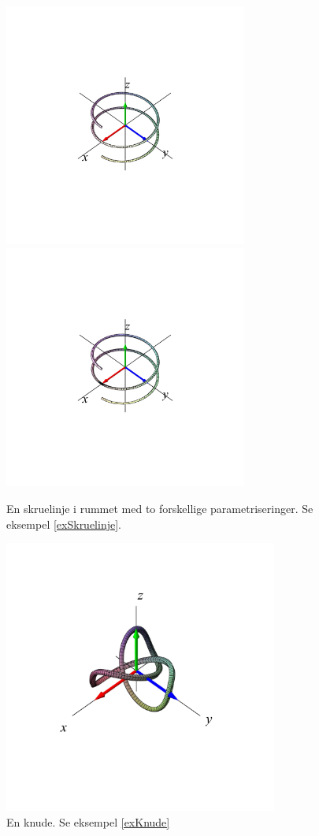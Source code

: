 \begin{figure}[ht]
\centerline{\includegraphics[height=80mm]{FIGS/plotHelix1}\, \, \, \includegraphics[height=80mm]{FIGS/plotHelix2}}
\begin{center}
\caption{\small{En skruelinje i rummet med to forskellige parametriseringer. Se
eksempel \ref{exSkruelinje}. }} \label{figv12}
\end{center}
\end{figure}


\begin{figure}[ht]
\centerline{\includegraphics[height=90mm]{FIGS/plotKnude}}
\begin{center}
\caption{\small{En {knude}. Se eksempel
\ref{exKnude} }} \label{figKnude}
\end{center}
\end{figure}


